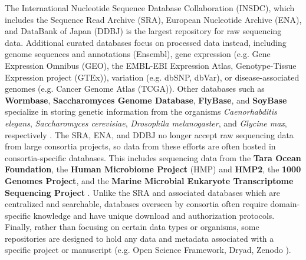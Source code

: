 \documentclass[10pt,letterpaper]{article}
\begin{document}
The International Nucleotide Sequence Database Collaboration (INSDC), which includes the Sequence Read Archive (SRA), European Nucleotide Archive (ENA), and DataBank of Japan (DDBJ) is the largest repository for raw sequencing data. 
Additional curated databases focus on processed data instead, including genome sequences and annotations (Ensembl), gene expression (e.g. Gene Expression Omnibus (GEO), the EMBL-EBI Expression Atlas, Genotype-Tissue Expression project (GTEx)), variation (e.g. dbSNP, dbVar), or disease-associated genomes (e.g. Cancer Genome Atlas (TCGA)).
Other databases such as \textbf{Wormbase}, \textbf{Saccharomyces Genome Database}, \textbf{FlyBase}, and \textbf{SoyBase} specialize in storing genetic information from the organisms \textit{Caenorhabditis elegans}, \textit{Saccharomyces cerevisiae}, \textit{Drosophila melanogaster}, and \textit{Glycine max}, respectively \cite{harris2020wormbase, cherry2012saccharomyces, st2014flybase, grant2010soybase}. 
The SRA, ENA, and DDBJ no longer accept raw sequencing data from large consortia projects, so data from these efforts are often hosted in consortia-specific databases. 
This includes sequencing data from the \textbf{Tara Ocean Foundation}, the \textbf{Human Microbiome Project} (HMP) and \textbf{HMP2}, the \textbf{1000 Genomes Project}, and the \textbf{Marine Microbial Eukaryote Transcriptome Sequencing Project} \cite{pesant2015open, turnbaugh2007human, integrative2014integrative, clarke20121000, keeling2014marine}. 
Unlike the SRA and associated databases which are centralized and searchable, databases overseen by consortia often require domain-specific knowledge and have unique download and authorization protocols.
Finally, rather than focusing on certain data types or organisms, some repositories are designed to hold any data and metadata associated with a specific project or manuscript (e.g. Open Science Framework, Dryad, Zenodo \cite{foster2017open}).

\end{document}
